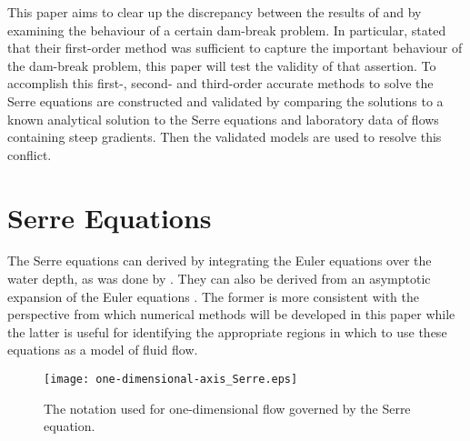 \documentclass[SingleSpace,12pt,Proceedings]{Serre_ASCE}
\begin{document}
This paper aims to clear up the discrepancy between the results of  and  by examining the behaviour of a certain dam-break problem. In particular, stated that their first-order method was sufficient to capture the important behaviour of the dam-break problem, this paper will test the validity of that assertion. To accomplish this first-, second- and third-order accurate methods to solve the Serre equations are constructed and validated by comparing the solutions to a known analytical solution to the Serre equations and laboratory data of flows containing steep gradients. Then the validated models are used to resolve this conflict. 

\section{Serre Equations}
\label{section:Serre Equations}
The Serre equations can derived by integrating the Euler equations over the water depth, as was done by . They can also be derived from an asymptotic expansion of the Euler equations \cite{Bonneton-Lannes-2009-16601}. The former is more consistent with the perspective from which numerical methods will be developed in this paper while the latter is useful for identifying the appropriate regions in which to use these equations as a model of fluid flow.
\begin{figure}
\begin{center}
\texttt{[image: one-dimensional-axis\_Serre.eps]}
\end{center}
\caption{The notation used for one-dimensional flow governed by the Serre equation.}
\label{fig:Notation}
\end{figure}
\end{document}
